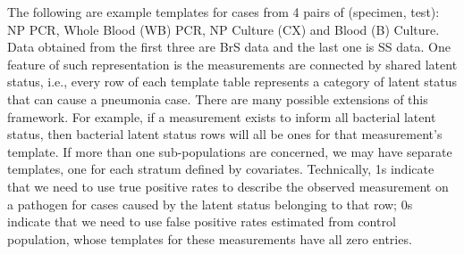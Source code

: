 \documentclass[article]{jss}
\begin{document}
The following are example templates for cases from 4 pairs of (specimen,
test): NP PCR, Whole Blood (WB) PCR, NP Culture (CX) and Blood (B)
Culture. Data obtained from the first three are BrS data and the last
one is SS data. One feature of such representation is the measurements
are connected by shared latent status, i.e., every row of each template
table represents a category of latent status that can cause a pneumonia
case. There are many possible extensions of this framework. For example,
if a measurement exists to inform all bacterial latent status, then
bacterial latent status rows will all be ones for that measurement's
template. If more than one sub-populations are concerned, we may have
separate templates, one for each stratum defined by covariates.
Technically, 1s indicate that we need to use true positive rates to
describe the observed measurement on a pathogen for cases caused by the
latent status belonging to that row; 0s indicate that we need to use
false positive rates estimated from control population, whose templates
for these measurements have all zero entries.
\end{document}
